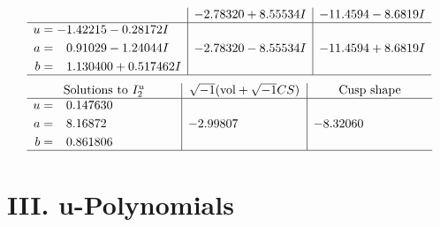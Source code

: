 \documentclass[1p]{elsarticle_modified}
\theoremstyle{definition}
\newcommand{\I}{\sqrt{-1}}
\begin{document}
$$\begin{array}{c|c|c}
 & -2.78320 + 8.55534 I & -11.4594 - 8.6819 I \\ \hline\begin{aligned}
u &= -1.42215 - 0.28172 I \\
a &= \phantom{-}0.91029 - 1.24044 I \\
b &= \phantom{-}1.130400 + 0.517462 I\end{aligned}
 & -2.78320 - 8.55534 I & -11.4594 + 8.6819 I\\
 \hline 
 \end{array}$$\newpage$$\begin{array}{c|c|c}  
\text{Solutions to }I^u_{2}& \I (\text{vol} + \sqrt{-1}CS) & \text{Cusp shape}\\
 \hline 
\begin{aligned}
u &= \phantom{-}0.147630\phantom{ +0.000000I} \\
a &= \phantom{-}8.16872\phantom{ +0.000000I} \\
b &= \phantom{-}0.861806\phantom{ +0.000000I}\end{aligned}
 & -2.99807\phantom{ +0.000000I} & -8.32060\phantom{ +0.000000I}\\
 \hline 
 \end{array}$$\newpage
\newpage\renewcommand{\arraystretch}{1}
\centering \section*{ III. u-Polynomials}
\end{document}
